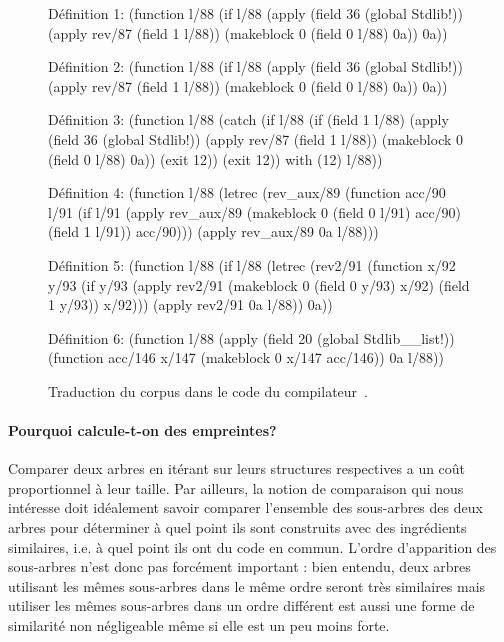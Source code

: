 \begin{figure}
\begin{lisp}
Définition 1:
(function l/88
  (if l/88
    (apply (field 36 (global Stdlib!)) (apply rev/87 (field 1 l/88))
      (makeblock 0 (field 0 l/88) 0a))
    0a))

Définition 2:
(function l/88
  (if l/88
    (apply (field 36 (global Stdlib!)) (apply rev/87 (field 1 l/88))
      (makeblock 0 (field 0 l/88) 0a))
    0a))

Définition 3:
(function l/88
  (catch
    (if l/88
      (if (field 1 l/88)
        (apply (field 36 (global Stdlib!)) (apply rev/87 (field 1 l/88))
          (makeblock 0 (field 0 l/88) 0a))
        (exit 12))
      (exit 12))
   with (12) l/88))

Définition 4:
(function l/88
  (letrec
    (rev_aux/89
       (function acc/90 l/91
         (if l/91
           (apply rev_aux/89 (makeblock 0 (field 0 l/91) acc/90)
             (field 1 l/91))
           acc/90)))
    (apply rev_aux/89 0a l/88)))

Définition 5:
(function l/88
  (if l/88
    (letrec
      (rev2/91
         (function x/92 y/93
           (if y/93
             (apply rev2/91 (makeblock 0 (field 0 y/93) x/92) (field 1 y/93))
             x/92)))
      (apply rev2/91 0a l/88))
    0a))

Définition 6:
(function l/88
  (apply (field 20 (global Stdlib__list!))
    (function acc/146 x/147 (makeblock 0 x/147 acc/146)) 0a l/88))
\end{lisp}
\caption{Traduction du corpus dans le code {\LambdaCode} du compilateur~\OCaml.}
\label{fig:lambda-corpus}
\end{figure}

\paragraph{Pourquoi calcule-t-on des empreintes?}

Comparer deux arbres en itérant sur leurs structures respectives a un
coût proportionnel à leur taille. Par ailleurs, la notion de
comparaison qui nous intéresse doit idéalement savoir comparer
l'ensemble des sous-arbres des deux arbres pour déterminer à quel
point ils sont construits avec des ingrédients similaires, i.e.  à
quel point ils ont du code en commun. L'ordre d'apparition des
sous-arbres n'est donc pas forcément important : bien entendu, deux
arbres utilisant les mêmes sous-arbres dans le même ordre seront
très similaires mais utiliser les mêmes sous-arbres dans un ordre
différent est aussi une forme de similarité non négligeable même
si elle est un peu moins forte.


